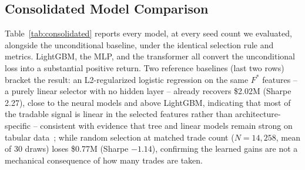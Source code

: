 \documentclass[sigconf,review,anonymous]{acmart}
\begin{document}
\subsection{Consolidated Model Comparison}
\label{sec:seedcount}
Table~\ref{tab:consolidated} reports every model, at every seed count we evaluated, alongside the unconditional baseline, under the identical selection rule and metrics. LightGBM, the MLP, and the transformer all convert the unconditional loss into a substantial positive return. Two reference baselines (last two rows) bracket the result: an L2-regularized logistic regression on the same $F^{\ast}$ features -- a purely linear selector with no hidden layer -- already recovers \$2.02M (Sharpe 2.27), close to the neural models and above LightGBM, indicating that most of the tradable signal is linear in the selected features rather than architecture-specific -- consistent with evidence that tree and linear models remain strong on tabular data~\cite{grinsztajn2022why,shwartzziv2022tabular,gorishniy2021revisiting}; while random selection at matched trade count ($N{=}14{,}258$, mean of 30 draws) loses \$0.77M (Sharpe $-1.14$), confirming the learned gains are not a mechanical consequence of how many trades are taken.
\end{document}
